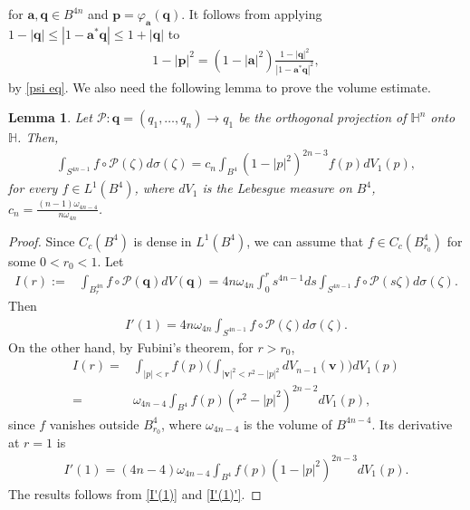 \documentclass[a4paper,11pt]{amsart}
\numberwithin{equation}{section}
\newtheorem{lem}{Lemma}[section]
\begin{document}
for $\mathbf{a},\mathbf{q}\in B^{4n}$ and $\mathbf{p}=\varphi_{\mathbf{a}}(\mathbf{q})$. It follows from applying $1-|\mathbf{q}|\leq|1-\mathbf{a}^*\mathbf{q}|\leq 1+|\mathbf{q}|$ to
\begin{equation*}\begin{aligned}
1-|\mathbf{p}|^2= (1-|\mathbf{a}|^2)\frac{1-|\mathbf{q}|^2}{|1-\mathbf{a}^*\mathbf{q}|^2},
\end{aligned}\end{equation*}
by \eqref{psi eq}. We also need the following lemma to prove the volume estimate.
\begin{lem}\label{lem proj}
Let $\mathcal{P}:\mathbf{q}=(q_1,\dots,q_n)\rightarrow q_1$ be the orthogonal projection of $\mathbb{H}^n$ onto $\mathbb{H}$. Then,
\begin{equation}\begin{aligned}\label{proj on 1}
\int_{S^{4n-1}}f\circ \mathcal{P}(\zeta)d\sigma(\zeta)=c_n\int_{B^{4}}(1-|p|^2)^{2n-3}f(p)dV_1(p),
\end{aligned}\end{equation}
for every $f\in L^1(B^4)$, where $dV_1$ is the Lebesgue measure on $B^4$, $c_n=\frac{(n-1)\omega_{4n-4}}{n\omega_{4n}}$.
\end{lem}
\begin{proof}
Since $C_c(B^4)$ is dense in $L^1(B^4)$, we can assume that $f\in C_c(B^4_{r_0})$ for some $0<r_0<1$.
Let
\begin{equation*}\begin{aligned}
I(r):=&\int_{B^{4n}_r}f\circ \mathcal{P}(\mathbf{q})dV(\mathbf{q})=4n\omega_{4n}\int_{0}^r s^{4n-1}ds\int_{S^{4n-1}}f\circ\mathcal{P}(s\zeta)d\sigma(\zeta).
\end{aligned}\end{equation*}
Then
\begin{equation}\begin{aligned}\label{I'(1)}
I'(1)=4n\omega_{4n}\int_{S^{4n-1}}f\circ\mathcal{P}(\zeta)d\sigma(\zeta).
\end{aligned}\end{equation}
On the other hand, by Fubini's theorem, for $r>r_0$,
\begin{equation*}\begin{aligned}
I(r)=&\int_{|p|<r}f (p)\bigg(\int_{|\mathbf{v}|^2<r^2-|p|^2}dV_{n-1}(\mathbf{v})\bigg)dV_1(p)\\
=&\omega_{4n-4}\int_{B^{4}}f(p)(r^2-|p|^2)^{2n-2}dV_1(p),
\end{aligned}\end{equation*}
since $f$ vanishes outside $B^{4}_{r_0}$, where $\omega_{4n-4}$ is the volume of $B^{4n-4}$.
Its derivative at $r=1$ is
\begin{equation}\begin{aligned}\label{I'(1)'}
I'(1)=(4n-4)\omega_{4n-4}\int_{B^{4}}f(p)(1-|p|^2)^{2n-3}dV_1(p).
\end{aligned}\end{equation}
The results follows from \eqref{I'(1)} and \eqref{I'(1)'}.
\end{proof}
\end{document}
